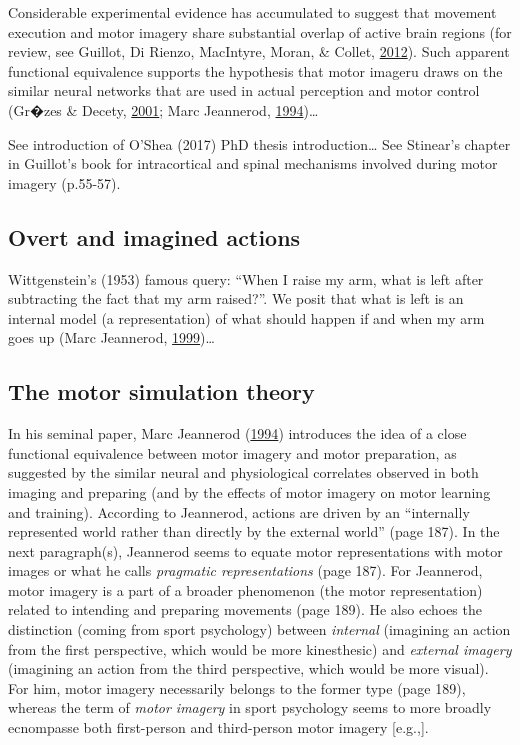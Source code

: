 \documentclass[a4paper,12pt,twoside,openright,oldfontcommands]{memoir}
\begin{document}
Considerable experimental evidence has accumulated to suggest that
movement execution and motor imagery share substantial overlap of active
brain regions (for review, see Guillot, Di Rienzo, MacIntyre, Moran, \&
Collet, \protect\hyperlink{ref-guillot_imagining_2012}{2012}). Such
apparent functional equivalence supports the hypothesis that motor
imageru draws on the similar neural networks that are used in actual
perception and motor control (Gr�zes \& Decety,
\protect\hyperlink{ref-grzes_functional_2001}{2001}; Marc Jeannerod,
\protect\hyperlink{ref-jeannerod_representing_1994}{1994})\ldots{}

See introduction of O'Shea (2017) PhD thesis introduction\ldots{} See
Stinear's chapter in Guillot's book for intracortical and spinal
mechanisms involved during motor imagery (p.55-57).

\subsection{Overt and imagined
actions}\label{overt-and-imagined-actions}

Wittgenstein's (1953) famous query: ``When I raise my arm, what is left
after subtracting the fact that my arm raised?''. We posit that what is
left is an internal model (a representation) of what should happen if
and when my arm goes up (Marc Jeannerod,
\protect\hyperlink{ref-jeannerod_25th_1999}{1999})\ldots{}

\subsection{The motor simulation
theory}\label{the-motor-simulation-theory}

In his seminal paper, Marc Jeannerod
(\protect\hyperlink{ref-jeannerod_representing_1994}{1994}) introduces
the idea of a close functional equivalence between motor imagery and
motor preparation, as suggested by the similar neural and physiological
correlates observed in both imaging and preparing (and by the effects of
motor imagery on motor learning and training). According to Jeannerod,
actions are driven by an ``internally represented world rather than
directly by the external world'' (page 187). In the next paragraph(s),
Jeannerod seems to equate motor representations with motor images or
what he calls \emph{pragmatic representations} (page 187). For
Jeannerod, motor imagery is a part of a broader phenomenon (the motor
representation) related to intending and preparing movements (page 189).
He also echoes the distinction (coming from sport psychology) between
\emph{internal} (imagining an action from the first perspective, which
would be more kinesthesic) and \emph{external imagery} (imagining an
action from the third perspective, which would be more visual). For him,
motor imagery necessarily belongs to the former type (page 189), whereas
the term of \emph{motor imagery} in sport psychology seems to more
broadly ecnompasse both first-person and third-person motor imagery
{[}e.g.,{]}.
\end{document}
